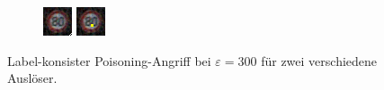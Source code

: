 \documentclass[11pt,a4paper]{article}
\numberwithin{equation}{section}
\begin{document}
	
	\begin{figure}
		\centering
	
		\begin{subfigure}{.3\textwidth}
		\centering
			\includegraphics[width=.45\linewidth]{255_1corner_infty300}
			\includegraphics[width=.45\linewidth]{sticker_infty300}
		\end{subfigure}
		
		\caption[Label-konsister Poisoning-Angriff für zwei verschiedene Auslöser.]{Label-konsister Poisoning-Angriff bei $\varepsilon=300$ für zwei verschiedene Auslöser.}		
		\label{im:CLPA}
	\end{figure}
\end{document}
